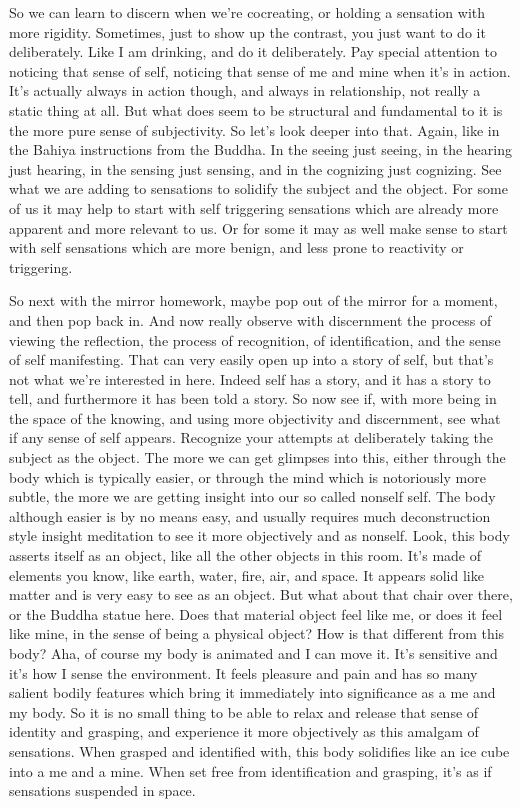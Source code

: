 \documentclass[12pt,openany]{book}
\begin{document}
So we can learn to discern when we're cocreating, or holding a sensation with more rigidity. Sometimes, just to show up the contrast, you just want to do it deliberately. Like I am drinking, and do it deliberately. Pay special attention to noticing that sense of self, noticing that sense of me and mine when it's in action. It’s actually always in action though, and always in relationship, not really a static thing at all. But what does seem to be structural and fundamental to it is the more pure sense of subjectivity. So let's look deeper into that. Again, like in the Bahiya instructions from the Buddha. In the seeing just seeing, in the hearing just hearing, in the sensing just sensing, and in the cognizing just cognizing. See what we are adding to sensations to solidify the subject and the object. For some of us it may help to start with self triggering sensations which are already more apparent and more relevant to us. Or for some it may as well make sense to start with self sensations which are more benign, and less prone to reactivity or triggering.

So next with the mirror homework, maybe pop out of the mirror for a moment, and then pop back in. And now really observe with discernment the process of viewing the reflection, the process of recognition, of identification, and the sense of self manifesting. That can very easily open up into a story of self,  but that's not what we're interested in here. Indeed self has a story, and it has a story to tell, and furthermore it has been told a story. So now see if, with more being in the space of the knowing, and using more objectivity and discernment, see what if any sense of self appears. Recognize your attempts at deliberately taking the subject as the object. The more we can get glimpses into this, either through the body which is typically easier, or through the mind which is notoriously more subtle,  the more we are getting insight into our so called nonself self. The body although easier is by no means easy, and usually requires much deconstruction style insight meditation to see it more objectively and as nonself. Look, this body asserts itself as an object, like all the other objects in this room. It's made of elements you know, like earth, water, fire, air, and space. It appears solid like matter and is very easy to see as an object. But what about that chair over there, or the Buddha statue here. Does that material object feel like me, or does it feel like mine, in the sense of being a physical object? How is that different from this body? Aha, of course my body is animated and I can move it. It's sensitive and it's how I sense the environment. It feels pleasure and pain and has so many salient bodily features which bring it immediately into significance as a me and my body. So it is no small thing to be able to relax and release that sense of identity and grasping, and experience it more objectively as this amalgam of sensations. When grasped and identified with, this body solidifies like an ice cube into a me and a mine. When set free from identification and grasping, it's as if sensations suspended in space.
\end{document}
